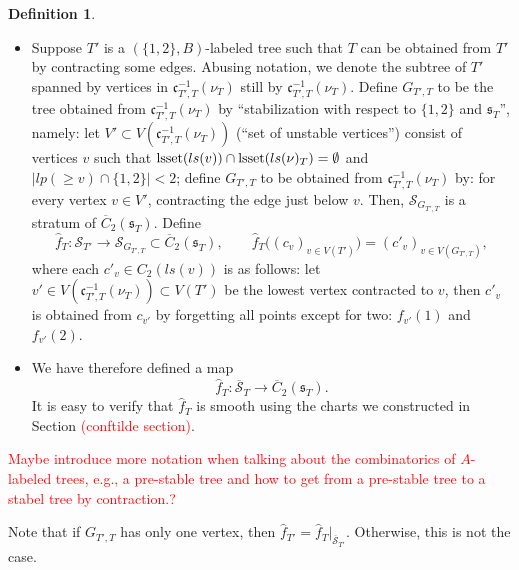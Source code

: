 \documentclass[11pt]{article}
\theoremstyle{definition}
\newtheorem{dfn}[thm]{Definition}
\theoremstyle{remark}
\def\ov#1{\overline{#1}}
\def\fc{\mathfrak{c}}
\def\fs{\mathfrak{s}}
\def\cS{\mathcal{S}}
\def\tn#1{\textnormal{#1}}
\begin{document}
\begin{dfn}
\begin{itemize}
\item Suppose $T'$ is a $(\{1,2\},B)$-labeled tree such that $T$ can be obtained from $T'$ by contracting some edges. 
Abusing notation, we denote the subtree of $T'$ spanned by vertices in $\fc_{T',T}^{-1}(\nu_T)$ still by $\fc_{T',T}^{-1}(\nu_T)$.
Define $G_{T',T}$ to be the tree obtained from $\fc_{T',T}^{-1}(\nu_T)$ by ``stabilization with respect to $\{1,2\}$ and $\fs_T$'', namely: let $V'\subset V(\fc_{T',T}^{-1}(\nu_T))$ (``set of unstable vertices'') consist of vertices $v$ such that $\tn{lsset}(ls(v))\cap\tn{lsset}(ls(\nu)_T)=\emptyset$ and $|lp(\ge v)\cap\{1,2\}|<2$; 
define $G_{T',T}$ to be obtained from $\fc_{T',T}^{-1}(\nu_T)$ by: for every vertex $v\in V'$, contracting the edge just below $v$. 
Then, $\cS_{G_{T',T}}$ is a stratum of $\ov{C}_2(\fs_T)$. 
Define
$$\hat{f}_T:\cS_{T'}\longrightarrow \cS_{G_{T',T}}\subset\ov{C}_2(\fs_T),\qquad \hat{f}_T\big((c_v)_{v\in V(T')}\big)=(c'_{v})_{v\in V(G_{T',T})},$$
where each $c'_{v}\in C_2(ls(v))$ is as follows: 
let $v'\in V(\fc_{T',T}^{-1}(\nu_T))\subset V(T')$ be the lowest vertex contracted to $v$, then $c'_{v}$ is obtained from $c_{v'}$ by forgetting all points except for two: $f_{v'}(1)$ and $f_{v'}(2)$. 
\item We have therefore defined a map 
$$\hat{f}_T:\ov{\cS}_T\longrightarrow\ov{C}_2(\fs_T).$$
It is easy to verify that $\hat{f}_T$ is smooth using the charts we constructed in Section \textcolor{red}{(conftilde section)}. 
\end{itemize}
\end{dfn}

\textcolor{red}{Maybe introduce more notation when talking about the combinatorics of $A$-labeled trees, e.g., a pre-stable tree and how to get from a pre-stable tree to a stabel tree by contraction.?}

Note that if $G_{T',T}$ has only one vertex, then $\hat{f}_{T'}=\hat{f}_{T}|_{\ov\cS_{T'}}$. Otherwise, this is not the case. 
\end{document}

